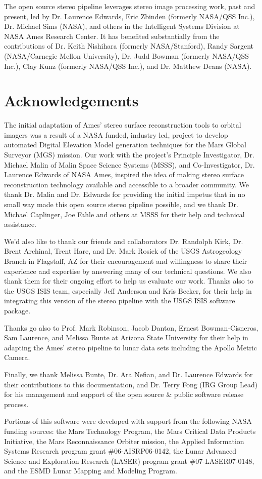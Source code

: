 The open source stereo pipeline leverages stereo image processing
work, past and present, led by Dr. Laurence Edwards, Eric Zbinden
(formerly NASA/QSS Inc.), Dr. Michael Sims (NASA), and others in the
Intelligent Systems Division at NASA Ames Research Center. It has
benefited substantially from the contributions of Dr. Keith Nishihara
(formerly NASA/Stanford), Randy Sargent (NASA/Carnegie Mellon
University), Dr. Judd Bowman (formerly NASA/QSS Inc.), Clay Kunz
(formerly NASA/QSS Inc.), and Dr. Matthew Deans (NASA).

\section*{Acknowledgements}

The initial adaptation of Ames' stereo surface reconstruction tools to
orbital imagers was a result of a NASA funded, industry led, project
to develop automated Digital Elevation Model generation techniques for
the Mars Global Surveyor (MGS) mission. Our work with the project's
Principle Investigator, Dr. Michael Malin of Malin Space Science
Systems (MSSS), and Co-Investigator, Dr. Laurence Edwards of NASA
Ames, inspired the idea of making stereo surface reconstruction
technology available and accessible to a broader community.  We thank
Dr. Malin and Dr. Edwards for providing the initial impetus that in no
small way made this open source stereo pipeline possible, and we thank
Dr. Michael Caplinger, Joe Fahle and others at MSSS for their help and
technical assistance.

We'd also like to thank our friends and collaborators Dr. Randolph
Kirk, Dr. Brent Archinal, Trent Hare, and Dr. Mark Rosiek of the USGS
Astrogeology Branch in Flagstaff, AZ for their encouragement and
willingness to share their experience and expertise by answering many
of our technical questions.  We also thank them for their ongoing
effort to help us evaluate our work.  Thanks also to the USGS ISIS
team, especially Jeff Anderson and Kris Becker, for their help in
integrating this version of the stereo pipeline with the USGS ISIS
software package.

Thanks go also to Prof. Mark Robinson, Jacob Danton, Ernest
Bowman-Cisneros, Sam Laurence, and Melissa Bunte at Arizona State
University for their help in adapting the Ames' stereo pipeline to
lunar data sets including the Apollo Metric Camera.

Finally, we thank Melissa Bunte, Dr. Ara Nefian, and Dr. Laurence
Edwards for their contributions to this documentation, and Dr. Terry
Fong (IRG Group Lead) for his management and support of the open
source \& public software release process.

Portions of this software were developed with support from the
following NASA funding sources: the Mars Technology Program, the Mars
Critical Data Products Initiative, the Mars Reconnaissance Orbiter
mission, the Applied Information Systems Research program grant
\#06-AISRP06-0142, the Lunar Advanced Science and Exploration Research
(LASER) program grant \#07-LASER07-0148, and the ESMD Lunar Mapping and
Modeling Program.
